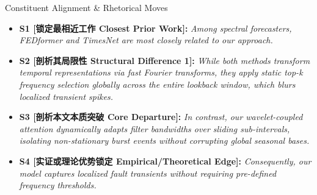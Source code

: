 \begin{TipBox}{Constituent Alignment \& Rhetorical Moves}
\begin{itemize}[leftmargin=1.5em]
  \item \textbf{S1 [锁定最相近工作 Closest Prior Work]:} \textit{Among spectral forecasters, FEDformer and TimesNet are most closely related to our approach.}\par{}
  \item \textbf{S2 [剖析其局限性 Structural Difference 1]:} \textit{While both methods transform temporal representations via fast Fourier transforms, they apply static top-k frequency selection globally across the entire lookback window, which blurs localized transient spikes.}\par{}
  \item \textbf{S3 [剖析本文本质突破 Core Departure]:} \textit{In contrast, our wavelet-coupled attention dynamically adapts filter bandwidths over sliding sub-intervals, isolating non-stationary burst events without corrupting global seasonal bases.}\par{}
  \item \textbf{S4 [实证或理论优势锁定 Empirical/Theoretical Edge]:} \textit{Consequently, our model captures localized fault transients without requiring pre-defined frequency thresholds.}\par{}
\end{itemize}
\end{TipBox}
\bigskip
